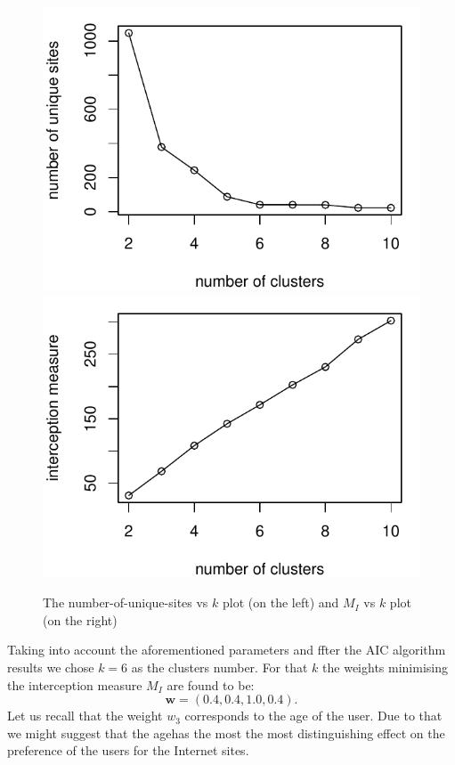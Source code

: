 \documentclass[runningheads,a4paper]{llncs}
\begin{document}
\begin{figure}

\includegraphics[scale=0.6]{fig_uurls.pdf}\hfill
\includegraphics[scale=0.6]{fig_meas.pdf}

\caption{The number-of-unique-sites vs $k$ plot (on the left) and $M_I$ vs $k$ plot (on the right)}
\label{N7Jti}
\end{figure}

Taking into account the aforementioned parameters and ffter the AIC algorithm results we chose $k=6$ as the clusters number. For that $k$ the weights minimising the interception measure $M_I$ are found to be:
\[
	\boldsymbol{w} = (0.4, 0.4, 1.0, 0.4).
\]
Let us recall that the weight $w_3$ corresponds to the age of the user. Due to that we might suggest that the agehas the most the most distinguishing effect on the preference of the users for the Internet sites.
\end{document}
